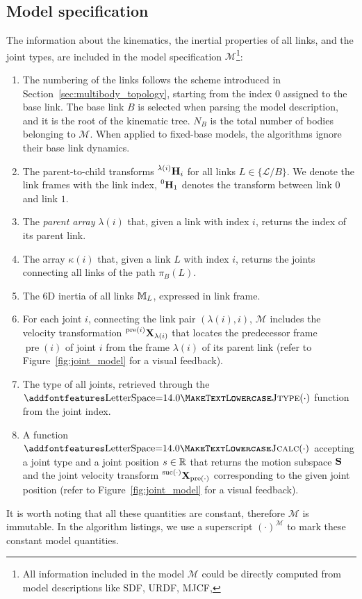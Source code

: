 \subsection{Model specification}

The information about the kinematics, the inertial properties of all links, and the joint types, are included in the model specification $\mathcal{M}$\footnote{All information included in the model $\mathcal{M}$ could be directly computed from model descriptions like \acs{SDF}, \acs{URDF}, \acs{MJCF}, \etc}:
%
\begin{enumerate}
%
\item The numbering of the links follows the scheme introduced in Section~\ref{sec:multibody_topology}, starting from the index 0 assigned to the base link.
The base link $B$ is selected when parsing the model description, and it is the root of the kinematic tree.
$N_B$ is the total number of bodies belonging to $\mathcal{M}$.
When applied to fixed-base models, the algorithms ignore their base link dynamics.
%
\item The parent-to-child transforms $\homo[\lambda(i)]_i$ for all links $L \in \{\mathcal{L}/B\}$.
We denote the link frames with the link index, \ie $\homo[0]_1$ denotes the transform between link $0$ and link $1$.
%
\item The \emph{parent array} $\lambda(i)$ that, given a link with index $i$, returns the index of its parent link.
%
\item The array $\kappa(i)$ that, given a link $L$ with index $i$, returns the joints connecting all links of the path $\pi_B(L)$.
%
\item The 6D inertia of all links $\masssix_L$, expressed in link frame.
%
\item For each joint $i$, connecting the link pair $(\lambda(i), i)$, $\mathcal{M}$ includes the velocity transformation $\transvel[\operatorname{pre}(i)]_{\lambda(i)}$ that locates the predecessor frame $\operatorname{pre}(i)$ of joint $i$ from the frame $\lambda(i)$ of its parent link (refer to Figure~\ref{fig:joint_model} for a visual feedback).
%
\item The type of all joints, retrieved through the $\text{\spacedlowsmallcaps{Jtype}}(\cdot)$ function from the joint index.
%
\item A function $\text{\spacedlowsmallcaps{Jcalc}}(\cdot)$ accepting a joint type and a joint position $\shape \in \realn$ that returns the motion subspace $\subspace$ and the joint velocity transform $\transvel[\operatorname{suc}(\cdot)]_{\operatorname{pre}(\cdot)}$ corresponding to the given joint position (refer to Figure~\ref{fig:joint_model} for a visual feedback).
%
\end{enumerate}
%
It is worth noting that all these quantities are constant, therefore $\mathcal{M}$ is immutable.
In the algorithm listings, we use a superscript $(\cdot)^\mathcal{M}$ to mark these constant model quantities.

